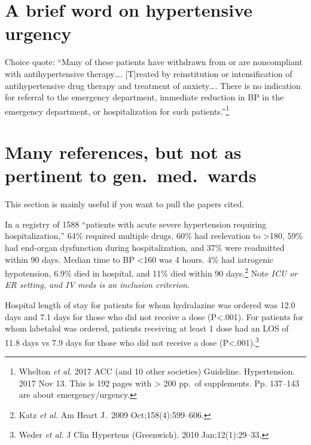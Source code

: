 \documentclass{tufte-handout}
\begin{document}

 

\section{A brief word on hypertensive urgency}


Choice quote: ``Many of these patients have withdrawn from or are
noncompliant with antihypertensive therapy\ldots{}. [T]reated by
reinstitution or intensification of antihypertensive drug therapy and
treatment of anxiety\ldots{}. There is no indication for referral to
the emergency department, immediate reduction in BP in the emergency
department, or hospitalization for such patients.''\footnote{Whelton
  \emph{et al.} 2017 ACC (and 10 other societies) Guideline. Hypertension.
  2017 Nov 13. This is 192 pages with > 200 pp.\ of supplements. Pp.
  137--143 are about emergency/urgency.}

\newpage

\section{Many references, but not as pertinent to gen.\ med.\ wards}

This section is mainly useful if you want to pull the papers cited.

In a registry of 1588 ``patients with acute severe hypertension
requiring hospitalization,'' 64\% required multiple drugs, 60\% had
reelevation to >180, 59\% had end-organ dysfunction during
hospitalization, and 37\% were readmitted within 90 days. Median time
to BP <160 was 4 hours. 4\% had iatrogenic hypotension, 6.9\% died in
hospital, and 11\% died within 90 days.\footnote{Katz \emph{et al.} Am Heart
  J.\ 2009 Oct;158(4):599--606.} Note \emph{ICU or ER setting, and IV
  meds is an inclusion criterion.}

Hospital length of stay for patients for whom hydralazine was ordered
was 12.0 days and 7.1 days for those who did not receive a dose
(P<.001). For patients for whom labetalol was ordered, patients
receiving at least 1 dose had an LOS of 11.8 days vs 7.9 days for
those who did not receive a dose (P<.001).\footnote{Weder \emph{et al.} J
  Clin Hypertens (Greenwich). 2010 Jan;12(1):29--33. }
\end{document}
